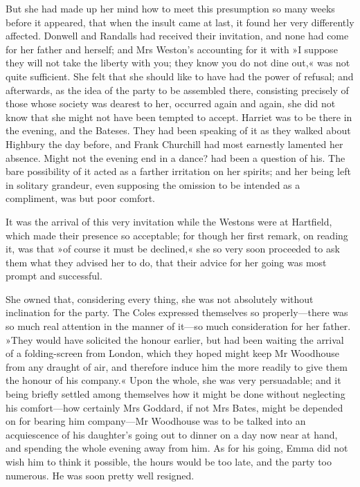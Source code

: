 But she had made up her mind how to meet this presumption so many weeks before it appeared, that when the insult came at last, it found her very differently affected. Donwell and Randalls had received their invitation, and none had come for her father and herself; and Mrs Weston's accounting for it with »I suppose they will not take the liberty with you; they know you do not dine out,« was not quite sufficient. She felt that she should like to have had the power of refusal; and afterwards, as the idea of the party to be assembled there, consisting precisely of those whose society was dearest to her, occurred again and again, she did not know that she might not have been tempted to accept. Harriet was to be there in the evening, and the Bateses. They had been speaking of it as they walked about Highbury the day before, and Frank Churchill had most earnestly lamented her absence. Might not the evening end in a dance? had been a question of his. The bare possibility of it acted as a farther irritation on her spirits; and her being left in solitary grandeur, even supposing the omission to be intended as a compliment, was but poor comfort.

It was the arrival of this very invitation while the Westons were at Hartfield, which made their presence so acceptable; for though her first remark, on reading it, was that »of course it must be declined,« she so very soon proceeded to ask them what they advised her to do, that their advice for her going was most prompt and successful.

She owned that, considering every thing, she was not absolutely without inclination for the party. The Coles expressed themselves so properly—there was so much real attention in the manner of it—so much consideration for her father. »They would have solicited the honour earlier, but had been waiting the arrival of a folding-screen from London, which they hoped might keep Mr Woodhouse from any draught of air, and therefore induce him the more readily to give them the honour of his company.« Upon the whole, she was very persuadable; and it being briefly settled among themselves how it might be done without neglecting his comfort—how certainly Mrs Goddard, if not Mrs Bates, might be depended on for bearing him company—Mr Woodhouse was to be talked into an acquiescence of his daughter's going out to dinner on a day now near at hand, and spending the whole evening away from him. As for his going, Emma did not wish him to think it possible, the hours would be too late, and the party too numerous. He was soon pretty well resigned.

